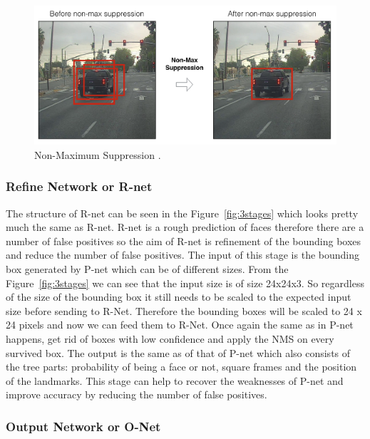 \begin{figure}[!htb]
    \centering
    \includegraphics[width=1\textwidth]{figures/non-max.png}
    \caption{ Non-Maximum Suppression \cite{boxescar}.}
    \label{fig:non-max}
\end{figure}
\subsubsection{Refine Network or R-net}

The structure of R-net can be seen in the Figure~\ref{fig:3stages} which looks pretty much the same as R-net. R-net is a rough prediction of faces therefore there are a number of false positives so the aim of R-net is refinement of the bounding boxes and reduce the number of false positives.
The input of this stage is the bounding box generated by P-net which can be of different sizes. From the Figure~\ref{fig:3stages} we can see that the input size is of size 24x24x3. So regardless of the size of the bounding box it still needs to be scaled to the expected input size before sending to R-Net. Therefore the bounding boxes will be scaled to 24 x 24 pixels and now we can feed them to R-Net. Once again the same as in P-net happens, get rid of boxes with low confidence and apply the NMS on every survived box. The output is the same as of that of P-net which also consists of the tree parts: probability of being a face or not, square frames and the position of the landmarks. This stage can help to recover the weaknesses of P-net and improve accuracy by reducing the number of false positives. 


\subsubsection{Output Network or O-Net}

